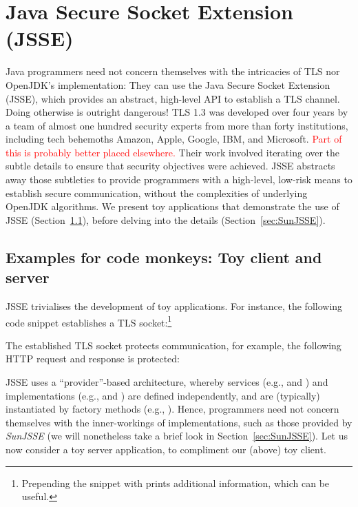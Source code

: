 \section{Java Secure Socket Extension (JSSE)}\label{sec:JSSE}

Java programmers need not concern themselves with the intricacies of TLS 
nor OpenJDK's implementation: They can 
use the Java Secure Socket Extension (JSSE), which provides an abstract, high-level
API to establish a TLS channel. Doing otherwise is outright dangerous! TLS 1.3 
was developed over four years by a team of almost one hundred security experts 
from more than forty institutions, including tech behemoths Amazon, Apple, Google, 
IBM, and Microsoft. \ifPresentationNotes \textcolor{red}{Part of this is probably 
better placed elsewhere.} \fi
Their work involved iterating over the subtle 
details to ensure that security objectives were achieved. 
JSSE abstracts away those subtleties to provide programmers with a high-level, 
low-risk means to establish secure communication, without the complexities of underlying 
OpenJDK algorithms.
We present toy applications that demonstrate the use of JSSE (Section~\ref{sec:monkeys}), 
before delving into the details (Section~\ref{sec:SunJSSE}).

\subsection{Examples for code monkeys: Toy client and server}\label{sec:monkeys}

\ifPresentationNotes
{}
\fi

JSSE trivialises the development of toy applications. For instance, the following code 
snippet establishes a TLS socket:\footnote{%
  Prepending the snippet with 
  prints additional information, which can be useful.}



\noindent 
The established TLS socket protects communication, for example, the following HTTP
request and response is protected:



\noindent
JSSE uses a ``provider''-based architecture, whereby services (e.g.,  and )
and implementations (e.g.,  and ) are defined independently, 
and are (typically) instantiated by factory methods (e.g., ). Hence, 
programmers need not concern themselves with the inner-workings of implementations, such as those provided 
by \emph{SunJSSE} (we will nonetheless take a brief look in Section~\ref{sec:SunJSSE}). 
Let us now consider a toy server application, to compliment our (above) toy client.

